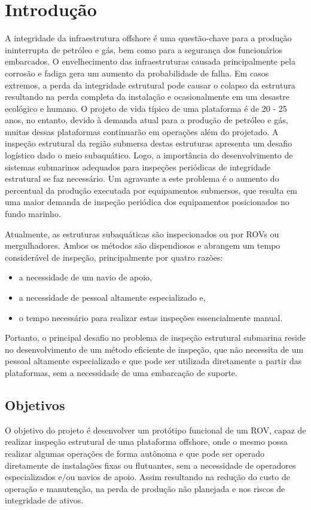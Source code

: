 \chapter{Introdução}
A integridade da infraestrutura offshore é uma questão-chave para a produção ininterrupta de petróleo e gás, bem como para a segurança dos funcionários embarcados. O envelhecimento das infraestruturas causada principalmente pela corrosão e fadiga gera um aumento da probabilidade de falha. Em casos extremos, a perda da integridade estrutural pode causar o colapso da estrutura resultando na perda completa da instalação e ocasionalmente em um desastre ecológico e humano. 
O projeto de vida típico de uma plataforma é de 20 - 25 anos, no entanto, devido à demanda atual para a produção de petróleo e gás, muitas dessas plataformas continuarão em operações além do projetado. A inspeção estrutural da região submersa destas estruturas apresenta um desafio logístico dado o meio subaquático. Logo, a importância do desenvolvimento de sistemas submarinos adequados para inspeções periódicas de integridade estrutural se faz necessário. Um agravante a este problema é o aumento do percentual da produção executada por equipamentos submersos, que resulta em uma maior demanda de inspeção periódica dos equipamentos posicionados no fundo marinho.  

Atualmente, as estruturas subaquáticas são inspecionados ou por ROVs ou mergulhadores. Ambos os métodos são dispendiosos e abrangem um tempo considerável de inspeção, principalmente por quatro razões: 
\begin{itemize}
	\item a necessidade de um navio de apoio,
	\item a necessidade de pessoal altamente especializado e,
	\item o tempo necessário para realizar estas inspeções essencialmente manual.
\end{itemize}

Portanto, o principal desafio no problema de inspeção estrutural submarina reside no desenvolvimento de um método eficiente de inspeção, que não necessita de um pessoal altamente especializado e que pode ser utilizada diretamente a partir das plataformas, sem a necessidade de uma embarcação de suporte.  

\section{Objetivos}
O objetivo do projeto é desenvolver um protótipo funcional de um ROV, capaz de realizar inspeção estrutural de uma plataforma offshore, onde o mesmo possa realizar algumas operações de forma autônoma e que pode ser operado diretamente de instalações fixas ou flutuantes, sem a necessidade de operadores especializados e/ou navios de apoio. Assim resultando na redução do custo de operação e manutenção, na perda de produção não planejada e nos riscos de integridade de ativos. 

